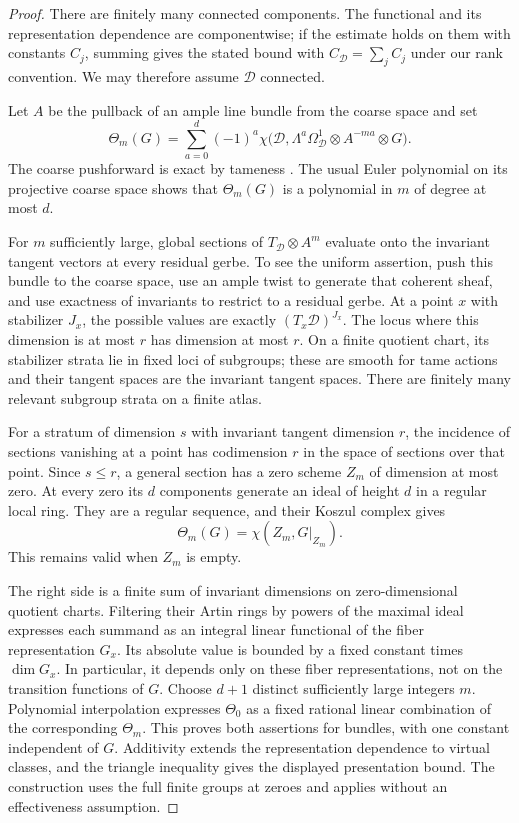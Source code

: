 \begin{proof}
There are finitely many connected components.  The functional and its
representation dependence are componentwise; if the estimate holds
on them with constants $C_j$, summing gives the stated bound with
$C_{\mathcal D}=\sum_j C_j$ under our rank convention.  We may
therefore assume $\mathcal D$ connected.

Let $A$ be the pullback of an ample line bundle from the coarse space
and set
\[
 \Theta_m(G)=\sum_{a=0}^d(-1)^a
   \chi\bigl(\mathcal D,\Lambda^a\Omega^1_{\mathcal D}
                       \otimes A^{-ma}\otimes G\bigr).
\]
The coarse pushforward is exact by tameness
\cite[Definition~3.1 and Theorem~3.2]{AbramovichOlssonVistoli2008}.  The usual Euler polynomial
on its projective coarse space shows that $\Theta_m(G)$ is a polynomial
in $m$ of degree at most $d$.

For $m$ sufficiently large, global sections of
$T_{\mathcal D}\otimes A^m$ evaluate onto the invariant tangent vectors
at every residual gerbe.  To see the uniform assertion, push this
bundle to the coarse space, use an ample twist to generate that coherent
sheaf, and use exactness of invariants to restrict to a residual gerbe.
At a point $x$ with stabilizer $J_x$, the possible values are exactly
$(T_x\mathcal D)^{J_x}$.  The locus where this dimension is at most $r$
has dimension at most $r$.  On a finite quotient chart, its stabilizer
strata lie in fixed loci of subgroups; these are smooth for tame actions
and their tangent spaces are the invariant tangent spaces.  There are
finitely many relevant subgroup strata on a finite atlas.

For a stratum of dimension $s$ with invariant tangent dimension $r$,
the incidence of sections vanishing at a point has codimension $r$ in
the space of sections over that point.  Since $s\le r$, a general
section has a zero scheme $Z_m$ of dimension at most zero.  At every
zero its $d$ components generate an ideal of height $d$ in a regular
local ring.  They are a regular sequence, and their Koszul complex
gives
\[
 \Theta_m(G)=\chi(Z_m,G|_{Z_m}).
\]
This remains valid when $Z_m$ is empty.

The right side is a finite sum of invariant dimensions on zero-dimensional
quotient charts.  Filtering their Artin rings by powers of the maximal
ideal expresses each summand as an integral linear functional of the
fiber representation $G_x$.  Its absolute value is bounded by a fixed
constant times $\dim G_x$.  In particular, it depends only on these
fiber representations, not on the transition functions of $G$.
Choose $d+1$ distinct sufficiently large integers $m$.  Polynomial
interpolation expresses $\Theta_0$ as a fixed rational linear
combination of the corresponding $\Theta_m$.  This proves both
assertions for bundles, with one constant independent of $G$.
Additivity extends the representation dependence to virtual classes,
and the triangle inequality gives the displayed presentation bound.
The construction uses the full finite groups at zeroes and applies
without an effectiveness assumption.
\end{proof}

